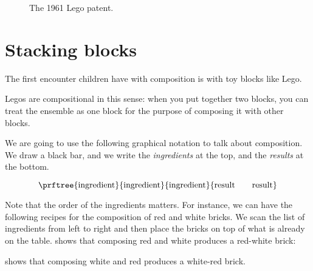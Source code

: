 \begin{figure*}[p]
    \centering
%
    \caption{The 1961 Lego patent.}
\end{figure*}


\section{Stacking blocks}





The first encounter children have with composition is with toy blocks like Lego.

Legos are compositional in this sense: when you put together two blocks, you can treat the ensemble as one block for the purpose of composing it with other blocks.

We are going to use the following graphical notation to talk about composition.
We draw a black bar, and we write the \emph{ingredients} at the top, and the \emph{results} at the bottom.

\begin{equation}
    \prftree{
        \text{ingredient}
    }{
        \text{ingredient}
    }{
        \text{ingredient}
    }{
        \text{result} \quad \quad \text{result}
    }
\end{equation}

Note that the order of the ingredients matters.
For instance, we can have the following recipes for the composition of red and white bricks.
We scan the list of ingredients from left to right and then place the bricks on top of what is already on the table.
 shows that composing red and white produces a red-white brick:

%
 shows that composing white and red produces a white-red brick.


